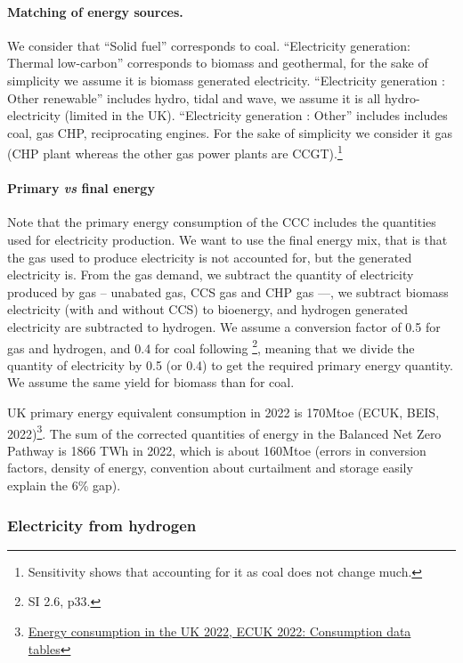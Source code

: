 \paragraph{Matching of energy sources.} We consider that ``Solid fuel'' corresponds to coal. ``Electricity generation: Thermal low-carbon'' corresponds to biomass and geothermal, for the sake of simplicity we assume it is biomass generated electricity. ``Electricity generation : Other renewable'' includes hydro, tidal and wave, we assume it is all hydro-electricity (limited in the UK).  ``Electricity generation : Other'' includes includes coal, gas CHP, reciprocating engines. For the sake of simplicity we consider it gas (CHP plant whereas the other gas power plants are CCGT).\footnote{Sensitivity shows that accounting for it as coal does not change much.}

\paragraph{Primary \textit{vs} final energy} Note that the primary energy consumption of the CCC includes the quantities used for electricity production. We want to use the final energy mix, that is that the gas used to produce electricity is not accounted for, but the generated electricity is. From the gas demand, we subtract the quantity of electricity produced by gas -- unabated gas, CCS gas and CHP gas ---, we subtract biomass electricity (with and without CCS) to bioenergy, and hydrogen generated electricity are subtracted to hydrogen. We assume a conversion factor of 0.5 for gas and hydrogen, and 0.4 for coal following \cite{wayEmpiricallyGroundedTechnology2022}\footnote{SI 2.6, p33.}, meaning that we divide the quantity of electricity by 0.5 (or 0.4) to get the required primary energy quantity. We assume the same yield for biomass than for coal. 

UK primary energy equivalent consumption in 2022 is 170Mtoe (ECUK, BEIS, 2022)\footnote{\href{https://www.gov.uk/government/statistics/energy-consumption-in-the-uk-2022}{Energy consumption in the UK 2022, ECUK 2022: Consumption data tables}}. The sum of the corrected quantities of energy in the Balanced Net Zero Pathway is 1866 TWh in 2022, which is about 160Mtoe (errors in conversion factors, density of energy, convention about curtailment and storage easily explain the 6\% gap).

\subsubsection{Electricity from hydrogen}

